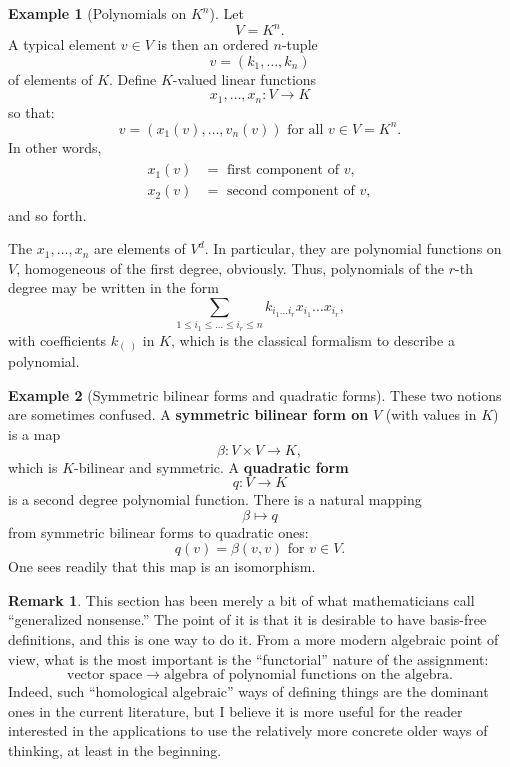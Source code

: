 \documentclass[12pt]{book}
\theoremstyle{plain}
\theoremstyle{definition}
\newtheorem{example}{Example}[section]
\newtheorem*{remark}{Remark}
\begin{document}
\begin{example}[Polynomials on $K^n$]
    Let
    $$V = K^n.$$
    A typical element $v \in V$ is then an ordered $n$-tuple
    $$v = (k_1, \dots, k_n)$$
    of elements of $K$.
    Define $K$-valued linear functions
    $$x_1, \dots, x_n: V \to K$$
    so that:
    $$v = (x_1(v), \dots, v_n(v)) \text{ for all } v \in V = K^n.$$
    In other words,
    \begin{align*}
    \begin{split}
        x_1(v) &= \text{ first component of } v, \\
        x_2(v) &= \text{ second component of } v,
    \end{split}
    \end{align*}
    and so forth.

    The $x_1, \dots, x_n$ are elements of $V^d$.
    In particular, they are polynomial functions on $V$, homogeneous of the first degree, obviously.
    Thus, polynomials of the $r$-th degree may be written in the form
    $$\sum_{1 \leq i_1 \leq \dots \leq i_r \leq n} k_{i_1 \dots i_r} x_{i_1} \dots x_{i_r},$$
    with coefficients $k_{(\ )}$ in $K$, which is the classical formalism to describe a polynomial.
\end{example}

\begin{example}[Symmetric bilinear forms and quadratic forms]
    These two notions are sometimes confused.
    A \textbf{symmetric bilinear form on} $V$ (with values in $K$) is a map
    $$\beta: V \times V \to K,$$
    which is $K$-bilinear and symmetric.
    A \textbf{quadratic form}
    $$q: V \to K$$
    is a second degree polynomial function.
    There is a natural mapping
    $$\beta \mapsto q$$
    from symmetric bilinear forms to quadratic ones:
    $$q(v) = \beta(v, v) \text{ for } v \in V.$$
    One sees readily that this map is an isomorphism.
\end{example}

\begin{remark}
    This section has been merely a bit of what mathematicians call ``generalized nonsense.''
    The point of it is that it is desirable to have basis-free definitions, and this is one way to do it.
    From a more modern algebraic point of view, what is the most important is the ``functorial'' nature of the assignment:
    $$\text{vector space} \to \text{algebra of polynomial functions on the algebra}.$$ %
    Indeed, such ``homological algebraic'' ways of defining things are the dominant ones in the current literature, but I believe it is more useful for the reader interested in the applications to use the relatively more concrete older ways of thinking, at least in the beginning.
\end{remark}
\end{document}
